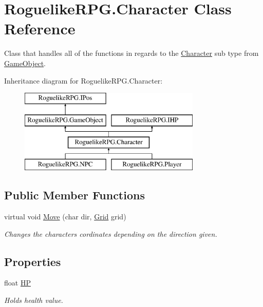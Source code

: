 \hypertarget{class_roguelike_r_p_g_1_1_character}{}\section{Roguelike\+R\+P\+G.\+Character Class Reference}
\label{class_roguelike_r_p_g_1_1_character}


Class that handles all of the functions in regards to the \mbox{\hyperlink{class_roguelike_r_p_g_1_1_character}{Character}} sub type from \mbox{\hyperlink{class_roguelike_r_p_g_1_1_game_object}{Game\+Object}}.  


Inheritance diagram for Roguelike\+R\+P\+G.\+Character\+:\begin{figure}[H]
\begin{center}
\leavevmode
\includegraphics[height=4.000000cm]{class_roguelike_r_p_g_1_1_character}
\end{center}
\end{figure}
\subsection*{Public Member Functions}
\begin{DoxyCompactItemize}
\item 
virtual void \mbox{\hyperlink{class_roguelike_r_p_g_1_1_character_a9b78a6de5cabe2c59d0b965733d9d63b}{Move}} (char dir, \mbox{\hyperlink{class_roguelike_r_p_g_1_1_grid}{Grid}} grid)
\begin{DoxyCompactList}\small\item\em Changes the characters cordinates depending on the direction given. \end{DoxyCompactList}\end{DoxyCompactItemize}
\subsection*{Properties}
\begin{DoxyCompactItemize}
\item 
float \mbox{\hyperlink{class_roguelike_r_p_g_1_1_character_a9d6a6a907e8d26c967218e7cf5ea02c7}{HP}}
\begin{DoxyCompactList}\small\item\em Holds health value. \end{DoxyCompactList}\end{DoxyCompactItemize}


